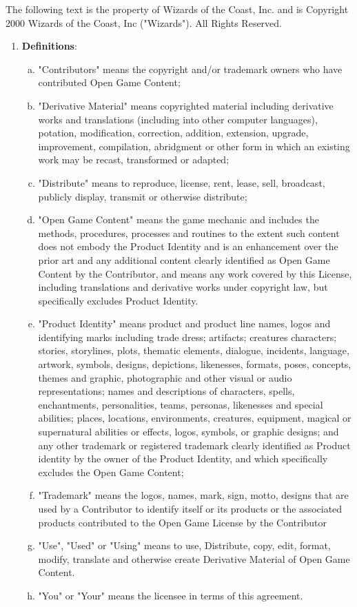 \begin{small}

The following text is the property of Wizards of the Coast, Inc. and is Copyright 2000 Wizards of the Coast, Inc ("Wizards"). All Rights Reserved.

\begin{enumerate}\raggedright
\item \textbf{Definitions}:
	\begin{enumerate}[(a)]\raggedright
	\item "Contributors" means the copyright and/or trademark owners who have contributed Open Game Content;
	\item "Derivative Material" means copyrighted material including derivative works and translations (including into other computer languages), potation, modification, correction, addition, extension, upgrade, improvement, compilation, abridgment or other form in which an existing work may be recast, transformed or adapted;
	\item "Distribute" means to reproduce, license, rent, lease, sell, broadcast, publicly display, transmit or otherwise distribute;
	\item "Open Game Content" means the game mechanic and includes the methods, procedures, processes and routines to the extent such content does not embody the Product Identity and is an enhancement over the prior art and any additional content clearly identified as Open Game Content by the Contributor, and means any work covered by this License, including translations and derivative works under copyright law, but specifically excludes Product Identity.
	\item "Product Identity" means product and product line names, logos and identifying marks including trade dress; artifacts; creatures characters; stories, storylines, plots, thematic elements, dialogue, incidents, language, artwork, symbols, designs, depictions, likenesses, formats, poses, concepts, themes and graphic, photographic and other visual or audio representations; names and descriptions of characters, spells, enchantments, personalities, teams, personas, likenesses and special abilities; places, locations, environments, creatures, equipment, magical or supernatural abilities or effects, logos, symbols, or graphic designs; and any other trademark or registered trademark clearly identified as Product identity by the owner of the Product Identity, and which specifically excludes the Open Game Content;
	\item "Trademark" means the logos, names, mark, sign, motto, designs that are used by a Contributor to identify itself or its products or the associated products contributed to the Open Game License by the Contributor
	\item "Use", "Used" or "Using" means to use, Distribute, copy, edit, format, modify, translate and otherwise create Derivative Material of Open Game Content.
	\item "You" or "Your" means the licensee in terms of this agreement.
	\end{enumerate}


\end{enumerate}
\end{small}
